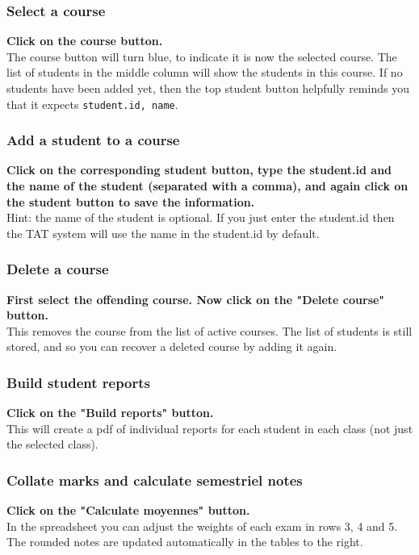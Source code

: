 \documentclass[10pt]{article}
\begin{document}
\subsubsection{Select a course}
\textbf{Click on the course button.} \\
The course button will turn blue, to indicate it is now the selected course. The list of students in the middle column will show the students in this course. If no students have been added yet, then the top student button helpfully reminds you that it expects \texttt{student.id, name}.

\subsubsection{Add a student to a course}
\textbf{Click on the corresponding student button, type the student.id and the name of the student (separated with a comma), and again click on the student button to save the information.} \\
Hint: the name of the student is optional. If you just enter the student.id then the TAT system will use the name in the student.id by default.

\subsubsection{Delete a course}
\textbf{First select the offending course. Now click on the "Delete course" button.} \\
This removes the course from the list of active courses. The list of students is still stored, and so you can recover a deleted course by adding it again.

\subsubsection{Build student reports}
\textbf{Click on the "Build reports" button.} \\
This will create a pdf of individual reports for each student in each class (not just the selected class).

\subsubsection{Collate marks and calculate semestriel notes}
\textbf{Click on the "Calculate moyennes" button.} \\
In the spreadsheet you can adjust the weights of each exam in rows 3, 4 and 5. The rounded notes are updated automatically in the tables to the right.
\end{document}
